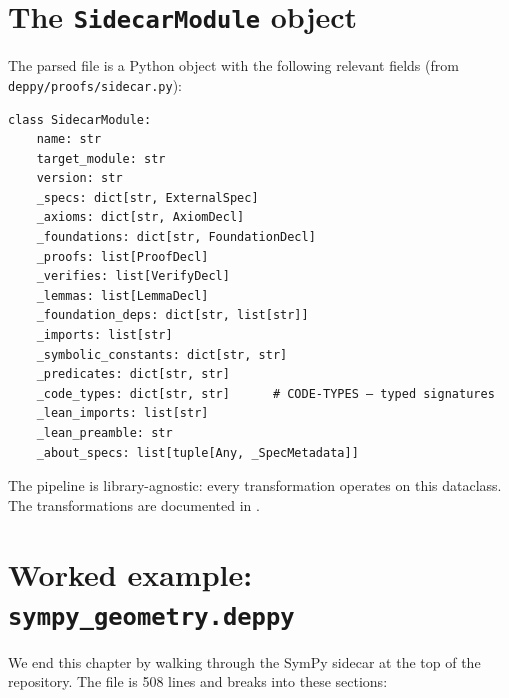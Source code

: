 \section{The \texttt{SidecarModule} object}
\label{sec:sidecar-module}

The parsed file is a Python object with the following relevant
fields (from \texttt{deppy/proofs/sidecar.py}):

\begin{lstlisting}[caption={\texttt{SidecarModule} excerpt --- the
key fields and their types.}]
class SidecarModule:
    name: str
    target_module: str
    version: str
    _specs: dict[str, ExternalSpec]
    _axioms: dict[str, AxiomDecl]
    _foundations: dict[str, FoundationDecl]
    _proofs: list[ProofDecl]
    _verifies: list[VerifyDecl]
    _lemmas: list[LemmaDecl]
    _foundation_deps: dict[str, list[str]]
    _imports: list[str]
    _symbolic_constants: dict[str, str]
    _predicates: dict[str, str]
    _code_types: dict[str, str]      # CODE-TYPES — typed signatures
    _lean_imports: list[str]
    _lean_preamble: str
    _about_specs: list[tuple[Any, _SpecMetadata]]
\end{lstlisting}

The pipeline is library-agnostic: every transformation operates on
this dataclass.  The transformations are documented in
.

\section{Worked example: \texttt{sympy\_geometry.deppy}}

We end this chapter by walking through the SymPy sidecar at the top
of the repository.  The file is 508 lines and breaks into these
sections:

